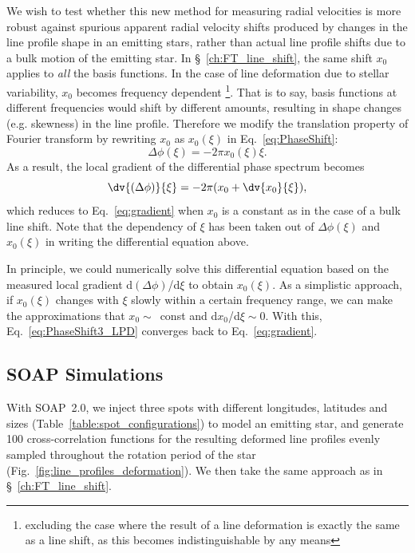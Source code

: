 We wish to test whether this new method for measuring radial velocities is more
robust against spurious apparent radial velocity shifts produced by changes in the
line profile shape in an emitting stars, rather than actual line profile shifts due to a bulk motion
of the emitting star.
In \S~\ref{ch:FT_line_shift}, the same shift $x_0$ applies to \textit{all} the basis functions. 
In the case of line deformation due to stellar variability, $x_0$ becomes frequency dependent 
\footnote{excluding the case where the result of a line deformation is exactly the same as a line shift, as 
this becomes indistinguishable by any means}. That is to say, basis functions at different frequencies would 
shift by different amounts, resulting in shape changes (e.g. skewness) in the line profile. 
Therefore we modify the translation property of Fourier transform
by rewriting $x_0$ as $x_0(\xi)$ in Eq.~\ref{eq:PhaseShift}:
\begin{equation}
	\Delta \phi(\xi) = -2 \pi x_0(\xi) \xi.
\label{eq:PhaseShift2_LPD}
\end{equation}
As a result, the local gradient of the differential phase spectrum becomes 
\begin{equation}
	\dv{(\Delta \phi)}{\xi} = -2 \pi (x_0 + \dv{x_0}{\xi}),
\label{eq:PhaseShift3_LPD}
\end{equation}
which reduces to Eq.~\ref{eq:gradient} when $x_0$ is a constant as in the case of a bulk line shift.
Note that the dependency of $\xi$ has been taken out of $\Delta \phi(\xi)$ and 
$x_0(\xi)$ in writing the differential equation above. 

In principle, we could numerically solve this differential equation based on the measured local gradient d$(\Delta \phi)$/d$\xi$
to obtain $x_0(\xi)$. As a simplistic approach, if $x_0(\xi)$ changes with $\xi$ slowly within a certain frequency range,
we can make the approximations that $x_0\sim$~const and d$x_0$/d$\xi\sim0$. With this, Eq.~\ref{eq:PhaseShift3_LPD} 
converges back to Eq.~\ref{eq:gradient}.

\subsection{SOAP Simulations}
\label{sec:Simulations}


With SOAP~2.0, we inject three spots with different longitudes, latitudes and sizes (Table~\ref{table:spot_configurations}) to model
an emitting star, and generate 100 cross-correlation functions for the resulting  deformed line profiles evenly sampled throughout the rotation
period of the star (Fig.~\ref{fig:line_profiles_deformation}). We then take the same approach as in  \S~\ref{ch:FT_line_shift}. 

